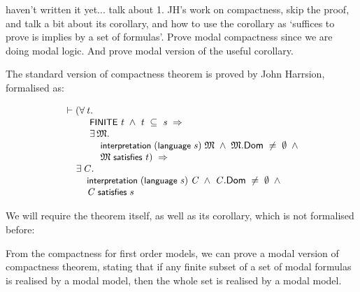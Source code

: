 \documentclass[letterpaper]{article}
\renewcommand{\HOLConst}[1]{{\textsf{\upshape\small #1}}}
\newenvironment{holmath}{\begin{displaymath}\begin{array}{l}}{\end{array}\end{displaymath}\ignorespacesafterend}
\begin{document}
haven't written it yet...
talk about 1. JH's work on compactness, skip the proof, and talk a bit about its corollary, and how to use the corollary as `suffices to prove is implies by a set of formulas'. Prove modal compactness since we are doing modal logic. And prove modal version of the useful corollary.

The standard version of compactness theorem is proved by John Harrsion, formalised as:

\begin{holmath}
  \ensuremath{\HOLTokenTurnstile}(\HOLSymConst{\HOLTokenForall{}}\HOLBoundVar{t}.\\
\;\;\;\;\;\;\;\;\;\;\HOLConst{FINITE}\;\HOLBoundVar{t}\;\HOLSymConst{\HOLTokenConj{}}\;\HOLBoundVar{t}\;\HOLSymConst{\HOLTokenSubset{}}\;\HOLFreeVar{s}\;\HOLSymConst{\HOLTokenImp{}}\\
\;\;\;\;\;\;\;\;\;\;\HOLSymConst{\HOLTokenExists{}}\HOLBoundVar{\ensuremath{\mathfrak{M}}}.\\
\;\;\;\;\;\;\;\;\;\;\;\;\;\;\HOLConst{interpretation}\;(\HOLConst{language}\;\HOLFreeVar{s})\;\HOLBoundVar{\ensuremath{\mathfrak{M}}}\;\HOLSymConst{\HOLTokenConj{}}\;\HOLBoundVar{\ensuremath{\mathfrak{M}}}.\HOLFieldName{Dom}\;\HOLSymConst{\HOLTokenNotEqual{}}\;\HOLSymConst{\HOLTokenEmpty{}}\;\HOLSymConst{\HOLTokenConj{}}\\
\;\;\;\;\;\;\;\;\;\;\;\;\;\;\HOLBoundVar{\ensuremath{\mathfrak{M}}}\;\HOLConst{satisfies}\;\HOLBoundVar{t})\;\HOLSymConst{\HOLTokenImp{}}\\
\;\;\;\;\;\HOLSymConst{\HOLTokenExists{}}\HOLBoundVar{C}.\\
\;\;\;\;\;\;\;\;\;\HOLConst{interpretation}\;(\HOLConst{language}\;\HOLFreeVar{s})\;\HOLBoundVar{C}\;\HOLSymConst{\HOLTokenConj{}}\;\HOLBoundVar{C}.\HOLFieldName{Dom}\;\HOLSymConst{\HOLTokenNotEqual{}}\;\HOLSymConst{\HOLTokenEmpty{}}\;\HOLSymConst{\HOLTokenConj{}}\\
\;\;\;\;\;\;\;\;\;\HOLBoundVar{C}\;\HOLConst{satisfies}\;\HOLFreeVar{s}
\end{holmath}

We will require the theorem itself, as well as its corollary, which is not formalised before:


From the compactness for first order models, we can prove a modal version of compactness theorem, stating that if any finite subset of a set of modal formulas is realised by a modal model, then the whole set is realised by a modal model.
\end{document}
